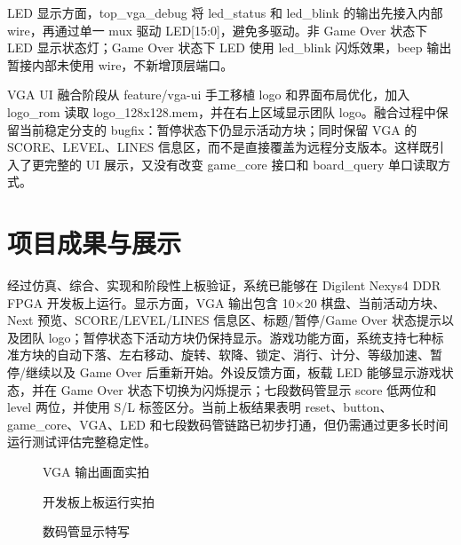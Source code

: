 \documentclass[UTF8,zihao=-4]{ctexart}
\begin{document}
LED 显示方面，top\_vga\_debug 将 led\_status 和 led\_blink 的输出先接入内部 wire，再通过单一 mux 驱动 LED[15:0]，避免多驱动。非 Game Over 状态下 LED 显示状态灯；Game Over 状态下 LED 使用 led\_blink 闪烁效果，beep 输出暂接内部未使用 wire，不新增顶层端口。

VGA UI 融合阶段从 feature/vga-ui 手工移植 logo 和界面布局优化，加入 logo\_rom 读取 logo\_128x128.mem，并在右上区域显示团队 logo。融合过程中保留当前稳定分支的 bugfix：暂停状态下仍显示活动方块；同时保留 VGA 的 SCORE、LEVEL、LINES 信息区，而不是直接覆盖为远程分支版本。这样既引入了更完整的 UI 展示，又没有改变 game\_core 接口和 board\_query 单口读取方式。

\section{项目成果与展示}

经过仿真、综合、实现和阶段性上板验证，系统已能够在 Digilent Nexys4 DDR FPGA 开发板上运行。显示方面，VGA 输出包含 10$\times$20 棋盘、当前活动方块、Next 预览、SCORE/LEVEL/LINES 信息区、标题/暂停/Game Over 状态提示以及团队 logo；暂停状态下活动方块仍保持显示。游戏功能方面，系统支持七种标准方块的自动下落、左右移动、旋转、软降、锁定、消行、计分、等级加速、暂停/继续以及 Game Over 后重新开始。外设反馈方面，板载 LED 能够显示游戏状态，并在 Game Over 状态下切换为闪烁提示；七段数码管显示 score 低两位和 level 两位，并使用 S/L 标签区分。当前上板结果表明 reset、button、game\_core、VGA、LED 和七段数码管链路已初步打通，但仍需通过更多长时间运行测试评估完整稳定性。

\begin{figure}[H]
\centering
{}
\caption{VGA 输出画面实拍}
\label{fig:result_vga}
\end{figure}

\begin{figure}[H]
\centering
{}
\caption{开发板上板运行实拍}
\label{fig:result_board}
\end{figure}

\begin{figure}[H]
\centering
{}
\caption{数码管显示特写}
\label{fig:result_7seg}
\end{figure}
\end{document}
